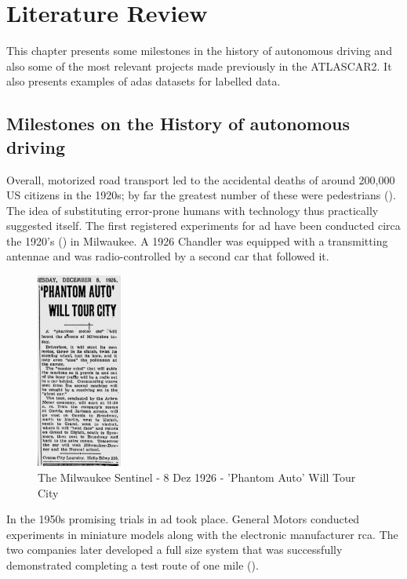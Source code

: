 \chapter{Literature Review}

This chapter presents some milestones in the history of autonomous driving and also some of the most relevant projects made previously in the ATLASCAR2. It also presents examples of \gls{adas} datasets for labelled data.


\section{Milestones on the History of autonomous driving}

Overall, motorized road transport led to the accidental deaths of around 200,000 US citizens in the 1920s; by far the greatest number of these were pedestrians (\cite{Kroger2016}). The idea of substituting error-prone humans with technology thus practically suggested itself. The first registered experiments for \gls{ad} have been conducted circa the 1920's (\cite{TheMilwaukeeSentinel}) in Milwaukee. A 1926 Chandler was equipped with a transmitting antennae and was radio-controlled by a second car that followed it.

\begin{figure}[htp]
	
	\centering
	\includegraphics[width=0.25\textwidth]{capstate/imgs/jornal.png}
	
	\caption{The Milwaukee Sentinel - 8 Dez 1926 - 'Phantom Auto' Will Tour City}
	\label{fig:waymo}
	
\end{figure}

In the 1950s promising trials in \gls{ad} took place. General Motors conducted experiments in miniature models along with the electronic manufacturer \gls{rca}. The two companies later developed a full size system that was successfully demonstrated completing a test route of one mile (\cite{Kroger2016}).

